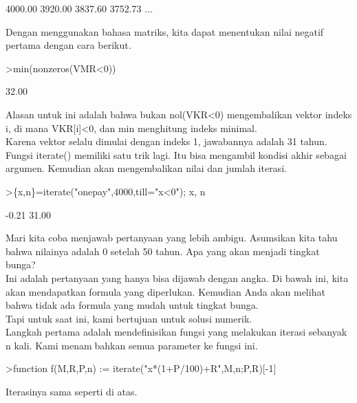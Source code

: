 \documentclass[a4paper,10pt]{article}
\begin{document}
\begin{eulernotebook}
\begin{eulercomment}
\begin{eulercomment}
\begin{eulercomment}
\begin{eulercomment}
\begin{eulercomment}
\begin{eulercomment}
\begin{euleroutput}
      4000.00     3920.00     3837.60     3752.73     ...
\end{euleroutput}
\begin{eulercomment}
Dengan menggunakan bahasa matriks, kita dapat menentukan nilai negatif
pertama dengan cara berikut.
\end{eulercomment}
\begin{eulerprompt}
>min(nonzeros(VMR<0))
\end{eulerprompt}
\begin{euleroutput}
        32.00 
\end{euleroutput}
\begin{eulercomment}
Alasan untuk ini adalah bahwa bukan nol(VKR\textless{}0) mengembalikan vektor
indeks i, di mana VKR[i]\textless{}0, dan min menghitung indeks minimal.\\
Karena vektor selalu dimulai dengan indeks 1, jawabannya adalah 31
tahun.\\
Fungsi iterate() memiliki satu trik lagi. Itu bisa mengambil kondisi
akhir sebagai argumen. Kemudian akan mengembalikan nilai dan jumlah
iterasi.
\end{eulercomment}
\begin{eulerprompt}
>\{x,n\}=iterate("onepay",4000,till="x<0"); x, n
\end{eulerprompt}
\begin{euleroutput}
        -0.21 
        31.00 
\end{euleroutput}
\begin{eulercomment}
Mari kita coba menjawab pertanyaan yang lebih ambigu. Asumsikan kita
tahu bahwa nilainya adalah 0 setelah 50 tahun. Apa yang akan menjadi
tingkat bunga?\\
Ini adalah pertanyaan yang hanya bisa dijawab dengan angka. Di bawah
ini, kita akan mendapatkan formula yang diperlukan. Kemudian Anda akan
melihat bahwa tidak ada formula yang mudah untuk tingkat bunga.\\
Tapi untuk saat ini, kami bertujuan untuk solusi numerik.\\
Langkah pertama adalah mendefinisikan fungsi yang melakukan iterasi
sebanyak n kali. Kami menambahkan semua parameter ke fungsi ini.
\end{eulercomment}
\begin{eulerprompt}
>function f(M,R,P,n) := iterate("x*(1+P/100)+R",M,n;P,R)[-1]
\end{eulerprompt}
\begin{eulercomment}
Iterasinya sama seperti di atas.


\end{eulercomment}
\end{eulercomment}
\end{eulercomment}
\end{eulercomment}
\end{eulercomment}
\end{eulercomment}
\end{eulercomment}
\end{eulernotebook}
\end{document}
